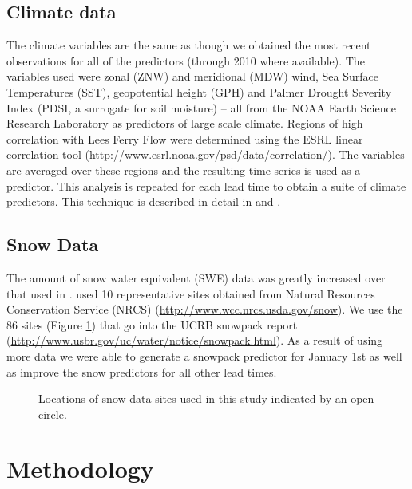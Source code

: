 \documentclass[final,5p,times,twocolumn,authoryear]{elsarticle}
\begin{document}
\subsection{Climate data}
The climate variables are the same as \citep{Bracken:2010cw} though we obtained the most recent observations for all of the predictors (through 2010 where available). The variables used were zonal (ZNW) and meridional (MDW) wind, Sea Surface Temperatures (SST), geopotential height (GPH) and Palmer Drought Severity Index (PDSI, a surrogate for soil moisture) -- all from the NOAA Earth Science Research Laboratory as predictors of large scale climate. Regions of high correlation with Lees Ferry Flow were determined using the ESRL linear correlation tool (\url{http://www.esrl.noaa.gov/psd/data/correlation/}). The variables are averaged over these regions and the resulting time series is used as a predictor. This analysis is repeated for each lead time to obtain a suite of climate predictors. This technique is described in detail in \cite{Grantz:2005ve}and \cite{Regonda2006}.

\subsection{Snow Data}
The amount of snow water equivalent (SWE) data was greatly increased over that used in \cite{Bracken:2010cw}. \cite{Bracken:2010cw} used 10 representative sites  obtained from Natural Resources Conservation Service (NRCS) (\url{http://www.wcc.nrcs.usda.gov/snow}). We use the 86 sites (Figure \ref{fig:map-snow}) that go into the UCRB snowpack report (\url{http://www.usbr.gov/uc/water/notice/snowpack.html}).  As a result of using more data we were able to generate a snowpack predictor for January 1st as well as improve the snow predictors for all other lead times. 


\begin{figure}[htbp] %
   \centering
   
   \caption{Locations of snow data sites used in this study indicated by an open circle.}
   \label{fig:map-snow}
\end{figure}


\section{Methodology}
\end{document}
